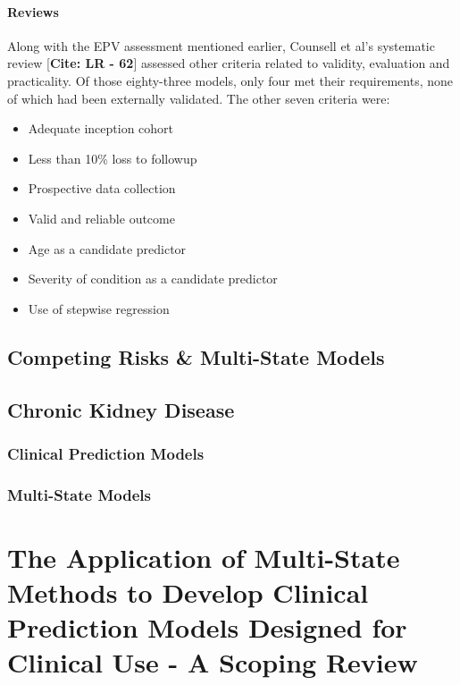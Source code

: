 \documentclass[12pt,PhD,twoside,openright]{muthesis}
\providecommand{\tightlist}{%
  \setlength{\itemsep}{0pt}\setlength{\parskip}{0pt}}
\begin{document}
\hypertarget{reviews}{%
\subsubsection{Reviews}\label{reviews}}

Along with the EPV assessment mentioned earlier, Counsell et al's systematic review {[}\textbf{Cite: LR - 62}{]} assessed other criteria related to validity, evaluation and practicality. Of those eighty-three models, only four met their requirements, none of which had been externally validated. The other seven criteria were:
\begin{itemize}
\tightlist
\item
  Adequate inception cohort
\item
  Less than 10\% loss to followup
\item
  Prospective data collection
\item
  Valid and reliable outcome
\item
  Age as a candidate predictor
\item
  Severity of condition as a candidate predictor
\item
  Use of stepwise regression
\end{itemize}
\hypertarget{competing-risks-multi-state-models}{%
\section{Competing Risks \& Multi-State Models}\label{competing-risks-multi-state-models}}

\hypertarget{chronic-kidney-disease}{%
\section{Chronic Kidney Disease}\label{chronic-kidney-disease}}

\hypertarget{clinical-prediction-models-1}{%
\subsection{Clinical Prediction Models}\label{clinical-prediction-models-1}}

\hypertarget{multi-state-models}{%
\subsection{Multi-State Models}\label{multi-state-models}}

\hypertarget{chap-scoping-review}{%
\chapter{The Application of Multi-State Methods to Develop Clinical Prediction Models Designed for Clinical Use - A Scoping Review}\label{chap-scoping-review}}
\end{document}
